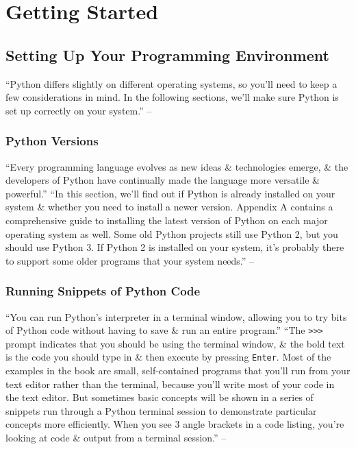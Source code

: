 \documentclass[oneside]{book}
\numberwithin{equation}{section}
\begin{document}
\section{Getting Started}

\subsection{Setting Up Your Programming Environment}
``Python differs slightly on different operating systems, so you'll need to keep a few considerations in mind. In the following sections, we'll make sure Python is set up correctly on your system.'' -- \cite[p. 3]{Matthes2019}

\subsubsection{Python Versions}
``Every programming language evolves as new ideas \& technologies emerge, \& the developers of Python have continually made the language more versatile \& powerful.'' ``In this section, we'll find out if Python is already installed on your system \& whether you need to install a newer version. Appendix A contains a comprehensive guide to installing the latest version of Python on each major operating system as well. Some old Python projects still use Python 2, but you should use Python 3. If Python 2 is installed on your system, it's probably there to support some older programs that your system needs.'' -- \cite[p. 4]{Matthes2019}

\subsubsection{Running Snippets of Python Code}
``You can run Python's interpreter in a terminal window, allowing you to try bits of Python code without having to save \& run an entire program.'' ``The \texttt{>>>} prompt indicates that you should be using the terminal window, \& the bold text is the code you should type in \& then execute by pressing \texttt{Enter}. Most of the examples in the book are small, self-contained programs that you'll run from your text editor rather than the terminal, because you'll write most of your code in the text editor. But sometimes basic concepts will be shown in a series of snippets run through a Python terminal session to demonstrate particular concepts more efficiently. When you see 3 angle brackets in a code listing, you're looking at code \& output from a terminal session.'' -- \cite[p. 4]{Matthes2019}
\end{document}
